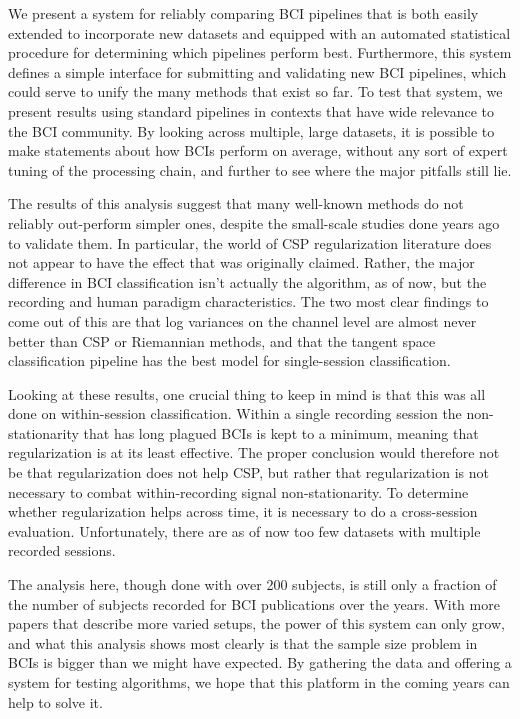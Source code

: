 We present a system for reliably comparing BCI pipelines that is both
easily extended to incorporate new datasets and equipped with an
automated statistical procedure for determining which pipelines
perform best. Furthermore, this system defines a simple interface for
submitting and validating new BCI pipelines, which could serve to
unify the many methods that exist so far. To test that system, we
present results using standard pipelines in contexts that have wide
relevance to the BCI community. By looking across multiple, large
datasets, it is possible to make statements about how BCIs perform on
average, without any sort of expert tuning of the processing chain,
and further to see where the major pitfalls still lie.

The results of this analysis suggest that many well-known methods do not
reliably out-perform simpler ones, despite the small-scale studies done years
ago to validate them. In particular, the world of CSP regularization literature
does not appear to have the effect that was originally claimed. Rather, the
major difference in BCI classification isn't actually the algorithm, as of now,
but the recording and human paradigm characteristics. The two most clear
findings to come out of this are that log variances on the channel level are
almost never better than CSP or Riemannian methods, and that the tangent space
classification pipeline has the best model for single-session classification.

Looking at these results, one crucial thing to keep in mind is that this was
all done on within-session classification. Within a single recording session the
non-stationarity that has long plagued BCIs is kept to a minimum, meaning that
regularization is at its least effective. The proper conclusion would therefore
not be that regularization does not help CSP, but rather that regularization is
not necessary to combat within-recording signal non-stationarity. To determine
whether regularization helps across time, it is necessary to do a cross-session
evaluation. Unfortunately, there are as of now too few datasets with multiple
recorded sessions.

The analysis here, though done with over 200 subjects, is still only a
fraction of the number of subjects recorded for BCI publications over
the years. With more papers that describe more varied setups, the
power of this system can only grow, and what this analysis shows most
clearly is that the sample size problem in BCIs is bigger than we
might have expected. By gathering the data and offering a system for
testing algorithms, we hope that this platform in the coming years can
help to solve it.

